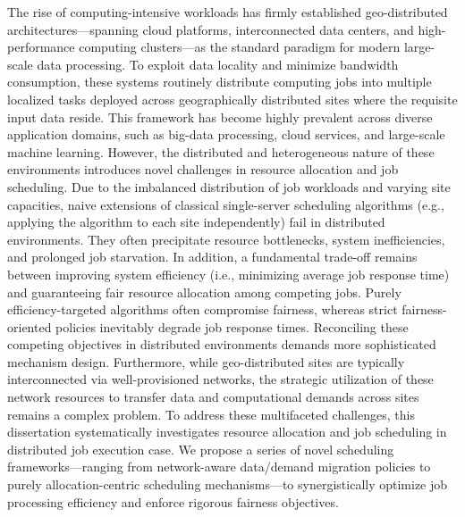 \documentclass[12pt,a4paper]{Thesis} %
\begin{document}
The rise of computing-intensive workloads has firmly established geo-distributed architectures—spanning cloud platforms, interconnected data centers, and high-performance computing clusters—as the standard paradigm for modern large-scale data processing. To exploit data locality and minimize bandwidth consumption, these systems routinely distribute computing jobs into multiple localized tasks deployed across geographically distributed sites where the requisite input data reside. This framework has become highly prevalent across diverse application domains, such as big-data processing, cloud services, and large-scale machine learning. However, the distributed and heterogeneous nature of these environments introduces novel challenges in resource allocation and job scheduling. Due to the imbalanced distribution of job workloads and varying site capacities, naive extensions of classical single-server scheduling algorithms (e.g., applying the algorithm to each site independently) fail in distributed environments. They often precipitate resource bottlenecks, system inefficiencies, and prolonged job starvation. In addition, a fundamental trade-off remains between improving system efficiency (i.e., minimizing average job response time) and guaranteeing fair resource allocation among competing jobs. Purely efficiency-targeted algorithms often compromise fairness, whereas strict fairness-oriented policies inevitably degrade job response times. Reconciling these competing objectives in distributed environments demands more sophisticated mechanism design. Furthermore, while geo-distributed sites are typically interconnected via well-provisioned networks, the strategic utilization of these network resources to transfer data and computational demands across sites remains a complex problem. To address these multifaceted challenges, this dissertation systematically investigates resource allocation and job scheduling in distributed job execution case. We propose a series of novel scheduling frameworks—ranging from network-aware data/demand migration policies to purely allocation-centric scheduling mechanisms—to synergistically optimize job processing efficiency and enforce rigorous fairness objectives.
\end{document}
